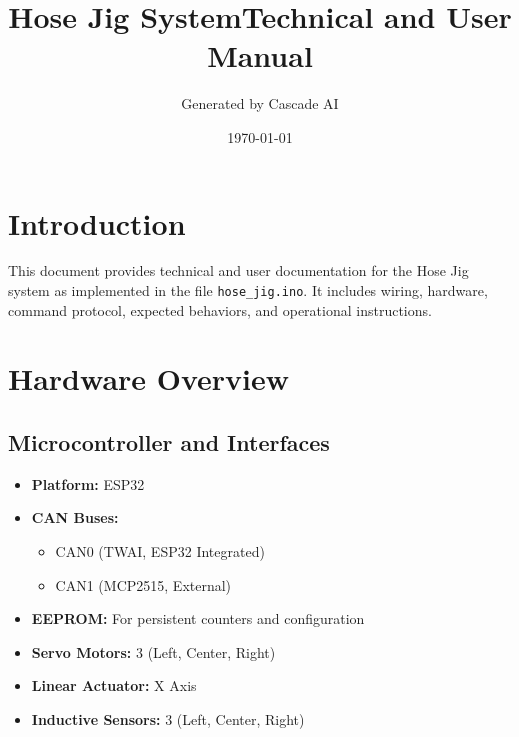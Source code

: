 \documentclass[12pt,a4paper]{article}
\title{Hose Jig System\newline Technical and User Manual}
\author{Generated by Cascade AI}
\date{\today}
\begin{document}
\maketitle

\tableofcontents
\newpage

\section{Introduction}
This document provides technical and user documentation for the Hose Jig system as implemented in the file \texttt{hose\_jig.ino}. It includes wiring, hardware, command protocol, expected behaviors, and operational instructions.

\section{Hardware Overview}
\subsection{Microcontroller and Interfaces}
\begin{itemize}
    \item \textbf{Platform:} ESP32
    \item \textbf{CAN Buses:}
    \begin{itemize}
        \item CAN0 (TWAI, ESP32 Integrated)
        \item CAN1 (MCP2515, External)
    \end{itemize}
    \item \textbf{EEPROM:} For persistent counters and configuration
    \item \textbf{Servo Motors:} 3 (Left, Center, Right)
    \item \textbf{Linear Actuator:} X Axis
    \item \textbf{Inductive Sensors:} 3 (Left, Center, Right)
\end{itemize}
\end{document}
